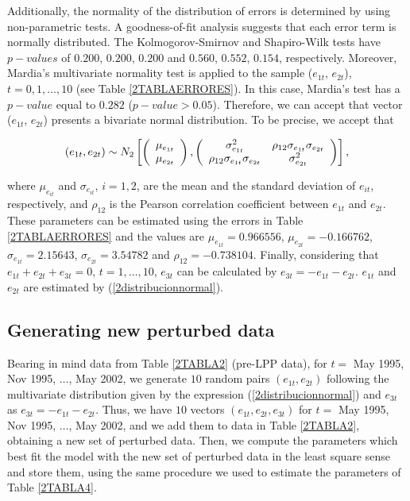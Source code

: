 Additionally, the normality of the distribution of errors is determined by using non-parametric tests. A goodness-of-fit analysis suggests that each error term is normally distributed. The Kolmogorov-Smirnov and Shapiro-Wilk tests have $p-values$ of $0.200$, $0.200$, $0.200$ and $0.560$, $0.552$, $0.154$, respectively. Moreover, Mardia's multivariate normality test is applied to the sample ($e_{1t}$, $e_{2t}$), $t= 0,1, \dots,10$ (see Table \ref{2TABLAERRORES}). In this case, Mardia's test has a $p-value$ equal to $0.282$ ($p-value>0.05$). Therefore, we can accept that vector ($e_{1t}$, $e_{2t}$) presents a bivariate normal distribution. To be precise, we accept that

\begin{equation}
\centering
(e_{1t}, e_{2t}) \sim N_2 
\left[
\left( 
\begin{array}{cc}
\mu_{e_{1t}}  \\
\mu_{e_{2t}}   \\
\end{array} 
\right),  
\left( 
\begin{array}{cc}
\sigma^2_{e_{1t}} & \rho_{12}\sigma_{e_{1t}}\sigma_{e_{2t}}  \\
 \rho_{12}\sigma_{e_{1t}}\sigma_{e_{2t}}  & \sigma^2_{e_{2t}} \\
\end{array} 
\right)
\right],
\label{2distribucionnormal}
\end{equation}

where $\mu_{e_{it}}$ and $\sigma_{e_{it}}$, $i=1, 2$, are the mean and the standard deviation of $e_{it}$, respectively, and $\rho_{12}$ is the Pearson correlation coefficient between $e_{1t}$ and $e_{2t}$. These parameters can be estimated using the errors in Table \ref{2TABLAERRORES} and the values are $\mu_{e_{1t}}=0.966556$, $\mu_{e_{2t}}=-0.166762$, $\sigma_{e_{1t}}=2.15643$, $\sigma_{e_{2t}}=3.54782$ and $\rho_{12}=-0.738104$. Finally, considering that $e_{1t}+e_{2t}+e_{3t}=0$, $t=1,\dots,10$, $e_{3t}$ can be calculated by $e_{3t}=-e_{1t}-e_{2t}$. $e_{1t}$ and $e_{2t}$ are estimated by (\ref{2distribucionnormal}).   

\subsection{Generating new perturbed data} 
Bearing in mind data from Table \ref{2TABLA2} (pre-LPP data), for $t=$ May 1995, Nov 1995, $\ldots$,  May 2002, we generate $10$ random pairs $(e_{1t}, e_{2t})$ following the multivariate distribution given by the expression (\ref{2distribucionnormal}) and $e_{3t}$ as $e_{3t}=-e_{1t}-e_{2t}$. Thus, we have $10$ vectors $(e_{1t}, e_{2t}, e_{3t})$ for $t=$ May 1995, Nov 1995, $\ldots$,  May 2002, and we add them to data in Table \ref{2TABLA2}, obtaining a new set of perturbed data. Then, we compute the parameters which best fit the model with the new set of perturbed data in the least square sense and store them, using the same procedure we used to estimate the parameters of Table \ref{2TABLA4}.


